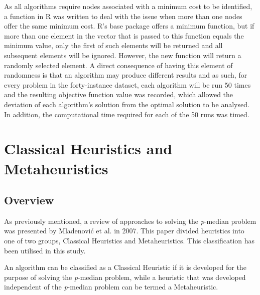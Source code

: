\documentclass[11pt]{article}
\begin{document}
	As all algorithms require nodes associated with a minimum cost to be identified, a function in R  was written to deal with the issue when more than one nodes offer the same minimum cost.  R's base package offers a minimum function, but if more than one element in the vector that is passed to this function equals the minimum value, only the first of such elements will be returned and all subsequent elements will be ignored.  However, the new function will return a randomly selected element.  A direct consequence of having this element of randomness is that an algorithm may produce different results and as such, for every problem in the forty-instance dataset, each algorithm will be run 50 times and the resulting objective function value was recorded, which allowed the deviation of each algorithm's solution from the optimal solution to be analysed.  In addition, the computational time required for each of the 50 runs was timed.
	
		
	\section{Classical Heuristics and Metaheuristics} \label{classical.meta.heuristics}
	\subsection{Overview} \label{heuristics.overview}
	As previously mentioned, a review of approaches to solving the \textit{p}-median problem was presented by Mladenovi\'{c} et al. \cite{MLAD07} in 2007.  This paper divided heuristics into one of two groups, Classical Heuristics and Metaheuristics.  This classification has been utilised in this study.
	
	An algorithm can be classified as a Classical Heuristic if it is developed for the purpose of solving the \emph{p}-median problem, while a heuristic that was developed independent of the \emph{p}-median problem can be termed a Metaheuristic.
		
	
\end{document}
